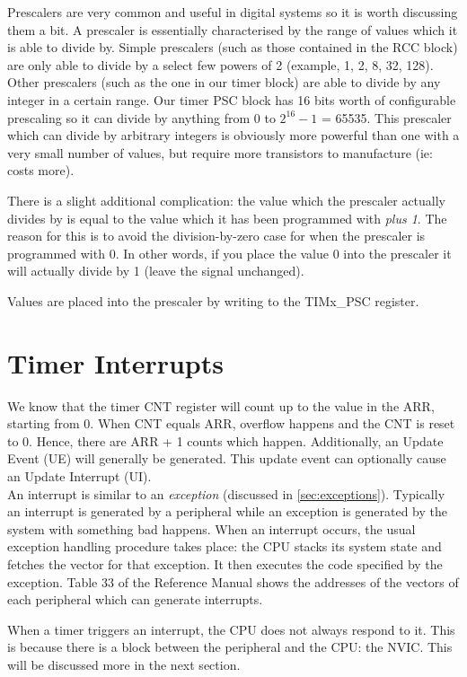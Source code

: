 Prescalers are very common and useful in digital systems so it is worth discussing them a bit. A prescaler is essentially characterised by the range of values which it is able to divide by. Simple prescalers (such as those contained in the RCC block) are only able to divide by a select few powers of 2 (example, 1, 2, 8, 32, 128). Other prescalers (such as the one in our timer block) are able to divide by any integer in a certain range. Our timer PSC block has 16 bits worth of configurable prescaling so it can divide by anything from 0 to $2^{16} - 1$ = 65535. This prescaler which can divide by arbitrary integers is obviously more powerful than one with a very small number of values, but require more transistors to manufacture (ie: costs more). 

There is a slight additional complication: the value which the prescaler actually divides by is equal to the value which it has been programmed with \emph{plus 1}. The reason for this is to avoid the division-by-zero case for when the prescaler is programmed with 0. In other words, if you place the value 0 into the prescaler it will actually divide by 1 (leave the signal unchanged). 

Values are placed into the prescaler by writing to the TIMx\_PSC register.

\section{Timer Interrupts}
We know that the timer CNT register will count up to the value in the ARR, starting from 0.
When CNT equals ARR, overflow happens and the CNT is reset to 0. 
Hence, there are ARR + 1 counts which happen.
Additionally, an Update Event (UE) will generally be generated. 
This update event can optionally cause an Update Interrupt (UI).\\

An interrupt is similar to an \emph{exception} (discussed in \autoref{sec:exceptions}). Typically an interrupt is generated by a peripheral while an exception is generated by the system with something bad happens. When an interrupt occurs, the usual exception handling procedure takes place: the CPU stacks its system state and fetches the vector for that exception. It then executes the code specified by the exception. Table 33 of the Reference Manual shows the addresses of the vectors of each peripheral which can generate interrupts. 

When a timer triggers an interrupt, the CPU does not always respond to it. This is because there is a block between the peripheral and the CPU: the NVIC. This will be discussed more in the next section.

